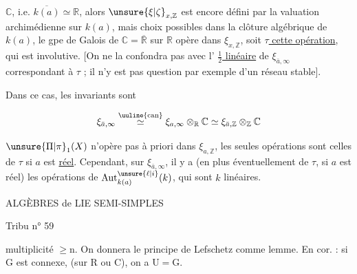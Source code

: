 $\mathbb{C}$, i.e. $\overline{k(a)}\simeq\mathbb{R}$, alors $\unsure{\xi|\zeta}_{x,\mathbb{Z}}$ est encore défini par la valuation archimédienne sur $k(a)$, mais   choix possibles dans la clôture algébrique de $k(a)$, le gpe de Galois de $\mathbb{C}=\overline{\mathbb{R}}$ sur $\mathbb{R}$ opère dans $\xi_{x,\mathbb{Z}}$, soit \uline{$\tau$ cette opération}, qui est involutive. [On ne la confondra pas avec l’ \uline{$\tfrac12$ linéaire} de $\xi_{\bar{a},\infty}$ correspondant à $\tau$ ; il n’y est pas question par exemple d’un réseau stable].



Dans ce cas, les invariants sont


\[
\xi_{\bar{a},\infty}\overset{\text{\uuline{can}}}{\simeq}\xi_{a,\infty}\otimes_{\mathbb{R}}\mathbb{C}\simeq\xi_{\bar{a},\mathbb{Z}}\otimes_{\mathbb{Z}}\mathbb{C}
\]

$\unsure{\Pi|\pi}_1(X)$ n’opère pas à priori dans $\xi_{a,\mathbb{Z}}$, les seules opérations sont celles de $\tau$ si $a$ est \uline{réel}. Cependant, sur $\xi_{\bar{a},\infty}$, il y a (en plus éventuellement de $\tau$, si $a$ est réel) les opérations de $\operatorname{Aut}_{k(a)}^{\unsure{\ell|i}}(k)$, qui sont $k$ linéaires.

ALGÈBRES de LIE SEMI-SIMPLES 

Tribu n° 59

multiplicité $\geqslant\mathrm{n}$. On donnera le principe de Lefschetz comme lemme. En cor. : si $\mathrm{G}$ est connexe, (sur $\mathrm{R}$ ou $\mathrm{C}$), on a $\mathrm{U}=\mathrm{G}$.


